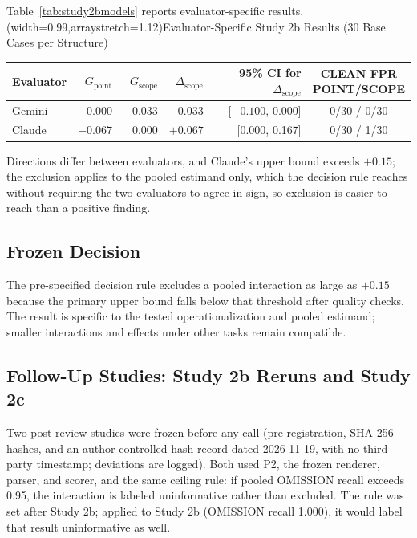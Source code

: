 \documentclass{ieeeaccess}
\newcommand{\Gpoint}{G_{\mathrm{point}}}
\newcommand{\Gscope}{G_{\mathrm{scope}}}
\newcommand{\Dscope}{\Delta_{\mathrm{scope}}}
\newcommand{\thead}[1]{\shortstack[c]{#1}}
\begin{document}
Table~\ref{tab:study2bmodels} reports evaluator-specific results.
\Table[t](width=0.99\columnwidth,arraystretch=1.12){Evaluator-Specific Study 2b Results (30 Base Cases per Structure) \label{tab:study2bmodels}}{\setlength{\tabcolsep}{4pt}\begin{tabular}{@{}lrrrrc@{}}
\toprule
Evaluator & $\Gpoint$ & $\Gscope$ & $\Dscope$ & \thead{95\% CI for\\$\Dscope$} & \thead{CLEAN FPR\\POINT/SCOPE}\\
\midrule
Gemini & 0.000 & $-0.033$ & $-0.033$ & [$-0.100$, 0.000] & 0/30 / 0/30\\
Claude & $-0.067$ & 0.000 & $+0.067$ & [0.000, 0.167] & 0/30 / 1/30\\
\bottomrule
\end{tabular}}

Directions differ between evaluators, and Claude's upper bound exceeds $+0.15$; the exclusion applies to the pooled estimand only, which the decision rule reaches without requiring the two evaluators to agree in sign, so exclusion is easier to reach than a positive finding.

\subsection{Frozen Decision}
The pre-specified decision rule excludes a pooled interaction as large as $+0.15$ because the primary upper bound falls below that threshold after quality checks. The result is specific to the tested operationalization and pooled estimand; smaller interactions and effects under other tasks remain compatible.

\subsection{Follow-Up Studies: Study 2b Reruns and Study 2c}
\label{sec:study2c}
Two post-review studies were frozen before any call (pre-registration, SHA-256 hashes, and an author-controlled hash record dated 2026-11-19, with no third-party timestamp; deviations are logged). Both used P2, the frozen renderer, parser, and scorer, and the same ceiling rule: if pooled OMISSION recall exceeds 0.95, the interaction is labeled uninformative rather than excluded. The rule was set after Study 2b; applied to Study 2b (OMISSION recall 1.000), it would label that result uninformative as well.
\end{document}

